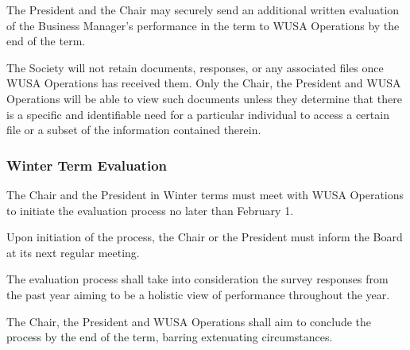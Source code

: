 The President and the Chair may securely send an additional written evaluation of the Business Manager's performance in the term to WUSA Operations by the end of the term.

The Society will not retain documents, responses, or any associated files once WUSA Operations has received them. Only the Chair, the President and WUSA Operations will be able to view such documents unless they determine that there is a specific and identifiable need for a particular individual to access a certain file or a subset of the
information contained therein.

\subsubsection{Winter Term Evaluation}
The Chair and the President in Winter terms must meet with WUSA Operations to initiate the evaluation process no later than February 1. 

Upon initiation of the process, the Chair or the President must inform the Board at its next regular meeting.

The evaluation process shall take into consideration the survey responses from the past year aiming to be a holistic view of performance throughout the year.

The Chair, the President and WUSA Operations shall aim to conclude the process by the end of the term, barring extenuating circumstances.

